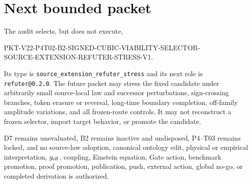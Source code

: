 \documentclass[11pt]{article}
\begin{document}
\section{Next bounded packet}

The audit selects, but does not execute,
\begin{flushleft}
\small\ttfamily
PKT-V22-P4T02-B2-SIGNED-CUBIC-VIABILITY-SELECTOR-\\
SOURCE-EXTENSION-REFUTER-STRESS-V1.
\end{flushleft}
Its type is \texttt{source\_extension\_refuter\_stress} and its next role is
\texttt{refuter@0.2.0}.  The future packet may stress the fixed candidate under
arbitrarily small source-local law and successor perturbations, sign-crossing
branches, token erasure or reversal, long-time boundary completion, off-family
amplitude variations, and all frozen-route controls.  It may not reconstruct a
frozen selector, import target behavior, or promote the candidate.

D7 remains unevaluated, B2 remains inactive and undisposed, P4--T03 remains
locked, and no source-law adoption, canonical ontology edit, physical or
empirical interpretation, $g_{\rm eff}$, coupling, Einstein equation, Gate
action, benchmark promotion, proof promotion, publication, push, external
action, global no-go, or completed derivation is authorized.
\end{document}
